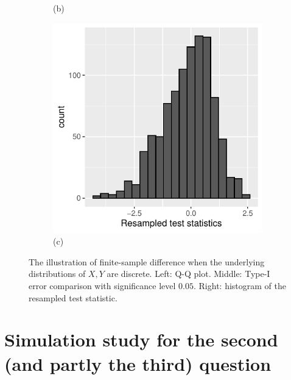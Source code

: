 \documentclass{article}
\begin{document}
\begin{figure}
\begin{subfigure}[h]{0.3\textwidth}
        \small{(b)}
    \end{subfigure}
    \begin{subfigure}[h]{0.3\textwidth}  
        \centering
        \includegraphics[width=\textwidth]{Figures/Q1/resampled-test-stats.pdf} \\ 
        \small{(c)}
    \end{subfigure}
    \caption{\small{The illustration of finite-sample difference when the underlying distributions of $X,Y$ are discrete.
    Left: Q-Q plot. Middle: Type-I error comparison with significance level $0.05$. Right: histogram of the resampled test 
    statistic.} }
    \label{fig:dCRT_GCM_binomial_poisson} 
\end{figure}


\section{Simulation study for the second (and partly the third) question}
\end{document}
